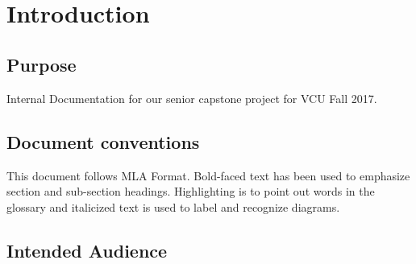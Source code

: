 \documentclass[10pt]{article}
\title{
\vspace{2in}
\textmd{\textbf{\projecttitle} \\}
\vspace{5in}
}
\author{\textbf{\hmwkAuthorName}}
\date{} %
\begin{document}
\maketitle








\newpage

\tableofcontents

\newpage













\section{Introduction}

\subsection{Purpose}

Internal Documentation for our senior capstone project for VCU Fall 2017. 

\subsection{Document conventions}

This document follows MLA Format. Bold-faced text has been used to emphasize section and sub-section headings.
Highlighting is to point out words in the glossary and italicized text is used to label and recognize diagrams.

\subsection{Intended Audience}
\end{document}
